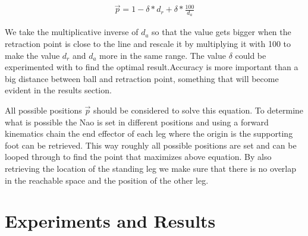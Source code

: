 \documentclass[a4paper]{article}
\begin{document}
\begin{align}
    \vec{p} = 1-\delta * d_r + \delta * \frac{100}{d_a}
\label{eq:delta}
\end{align}

We take the multiplicative inverse of $d_a$ so that the value gets bigger when the
retraction point is close to the line and rescale it by multiplying it with 100 to
make the value $d_r$ and $d_a$ more in the same range. The value $\delta$  could
be experimented with to find the optimal result.Accuracy is more important than a big distance between ball and
retraction point, something that will become evident in the results section.

All possible positions $\vec{p}$ should be considered to solve this equation. To
determine what is possible the Nao is set in different positions and using a
forward kinematics chain the end effector of each leg where the origin is the
supporting foot can be retrieved. This way roughly all possible positions are set and can be
looped through to find the point that maximizes above equation. By also
retrieving the location of the standing leg we make sure that there is
no overlap in the reachable space and the position of the other leg.

\section{Experiments and Results}
\end{document}
